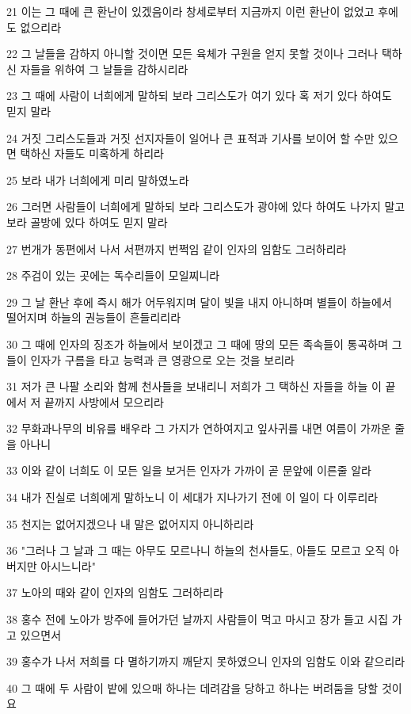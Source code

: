 \par 21 이는 그 때에 큰 환난이 있겠음이라 창세로부터 지금까지 이런 환난이 없었고 후에도 없으리라
\par 22 그 날들을 감하지 아니할 것이면 모든 육체가 구원을 얻지 못할 것이나 그러나 택하신 자들을 위하여 그 날들을 감하시리라
\par 23 그 때에 사람이 너희에게 말하되 보라 그리스도가 여기 있다 혹 저기 있다 하여도 믿지 말라
\par 24 거짓 그리스도들과 거짓 선지자들이 일어나 큰 표적과 기사를 보이어 할 수만 있으면 택하신 자들도 미혹하게 하리라
\par 25 보라 내가 너희에게 미리 말하였노라
\par 26 그러면 사람들이 너희에게 말하되 보라 그리스도가 광야에 있다 하여도 나가지 말고 보라 골방에 있다 하여도 믿지 말라
\par 27 번개가 동편에서 나서 서편까지 번쩍임 같이 인자의 임함도 그러하리라
\par 28 주검이 있는 곳에는 독수리들이 모일찌니라
\par 29 그 날 환난 후에 즉시 해가 어두워지며 달이 빛을 내지 아니하며 별들이 하늘에서 떨어지며 하늘의 권능들이 흔들리리라
\par 30 그 때에 인자의 징조가 하늘에서 보이겠고 그 때에 땅의 모든 족속들이 통곡하며 그들이 인자가 구름을 타고 능력과 큰 영광으로 오는 것을 보리라
\par 31 저가 큰 나팔 소리와 함께 천사들을 보내리니 저희가 그 택하신 자들을 하늘 이 끝에서 저 끝까지 사방에서 모으리라
\par 32 무화과나무의 비유를 배우라 그 가지가 연하여지고 잎사귀를 내면 여름이 가까운 줄을 아나니
\par 33 이와 같이 너희도 이 모든 일을 보거든 인자가 가까이 곧 문앞에 이른줄 알라
\par 34 내가 진실로 너희에게 말하노니 이 세대가 지나가기 전에 이 일이 다 이루리라
\par 35 천지는 없어지겠으나 내 말은 없어지지 아니하리라
\par 36 "그러나 그 날과 그 때는 아무도 모르나니 하늘의 천사들도, 아들도 모르고 오직 아버지만 아시느니라"
\par 37 노아의 때와 같이 인자의 임함도 그러하리라
\par 38 홍수 전에 노아가 방주에 들어가던 날까지 사람들이 먹고 마시고 장가 들고 시집 가고 있으면서
\par 39 홍수가 나서 저희를 다 멸하기까지 깨닫지 못하였으니 인자의 임함도 이와 같으리라
\par 40 그 때에 두 사람이 밭에 있으매 하나는 데려감을 당하고 하나는 버려둠을 당할 것이요

